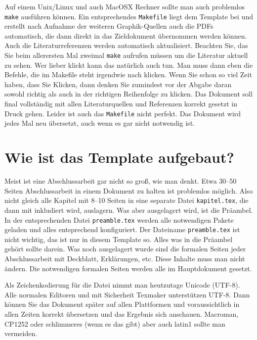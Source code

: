 \documentclass[11pt,a4paper]{report}
\begin{document}
Auf einem Unix/Linux und auch MacOSX Rechner sollte man auch problemlos 
\verb|make| ausführen können. 
Ein entsprechendes \verb|Makefile| liegt dem Template bei und erstellt nach 
Aufnahme der weiteren Graphik-Quellen auch die PDFs automatisch, die
dann direkt in das Zieldokument übernommen werden können.
Auch die Literaturreferenzen werden automatisch aktualisiert.
Beachten Sie, das Sie beim allerersten Mal zweimal \texttt{make}
aufrufen müssen um die Literatur aktuell zu sehen.
Wer lieber klickt kann das natürlich auch tun. Man muss dann
eben die Befehle, die im Makefile steht irgendwie nach klicken.
Wenn Sie schon so viel Zeit haben, dass Sie Klicken, dann denken
Sie zumindest vor der Abgabe daran sowohl richtig als auch in 
der richtigen Reihenfolge zu klicken.
Das Dokument soll final vollständig mit allen Literaturquellen und
Referenzen korrekt gesetzt in Druck gehen. 
Leider ist auch das \verb|Makefile| nicht perfekt. 
Das Dokument wird jedes Mal neu übersetzt, auch wenn es gar nicht
notwendig ist.

\section{Wie ist das Template aufgebaut?} \label{sec:template}

Meist ist eine Abschlussarbeit gar nicht so groß, wie man denkt.
Etwa 30--50 Seiten Abschlussarbeit in einem Dokument zu halten ist
problemlos möglich. 
Also nicht gleich alle Kapitel mit 8--10 Seiten in eine separate 
Datei \verb|kapitel.tex|, die dann mit \verb||
inkludiert wird, auslagern.
Was aber ausgelagert wird, ist die Präambel. 
In der entsprechenden Datei \verb|preamble.tex| werden alle 
notwendigen Pakete geladen und alles entsprechend konfiguriert.
Der Dateiname \verb|preamble.tex| ist nicht wichtig, das ist 
nur in diesem Template so.
Alles was in die Präambel gehört sollte darein.
Was noch ausgelagert wurde sind die formalen Seiten jeder 
Abschlussarbeit mit Deckblatt, Erklärungen, etc. 
Diese Inhalte muss man nicht ändern. 
Die notwendigen formalen Seiten werden alle im Hauptdokument gesetzt. 

Als Zeichenkodierung für die Datei nimmt man heutzutage Unicode (UTF-8).
Alle normalen Editoren und mit Sicherheit Texmaker unterstützen UTF-8.
Dann können Sie das Dokument später auf allen Plattformen und voraussichtlich
in allen Zeiten korrekt übersetzen und das Ergebnis sich anschauen.
Macroman, CP1252 oder schlimmeres (wenn es das gibt) aber auch latin1 
sollte man vermeiden.
\end{document}

